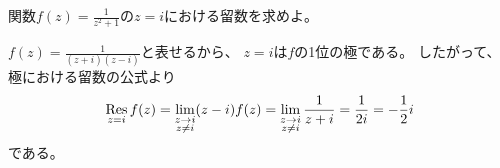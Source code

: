 \documentclass[report]{jlreq}
\begin{document}
\begin{problem}[ChatGPT]
    関数$f(z) = \frac{1}{z^2 + 1}$の$z = i$における留数を求めよ。
\end{problem}

\begin{answer}
    $f(z) = \frac{1}{(z + i)(z - i)}$と表せるから、
    $z = i$は$f$の1位の極である。
    したがって、極における留数の公式より
    \begin{equation}
        \operatorname*{Res}_{z = i} f(z)
            = \lim_{\substack{z \to i \\ z \neq i}}
                (z - i) f(z)
            = \lim_{\substack{z \to i \\ z \neq i}}
                \frac{1}{z + i}
            = \frac{1}{2i}
            = - \frac{1}{2} i
    \end{equation}
    である。
\end{answer}
\end{document}
